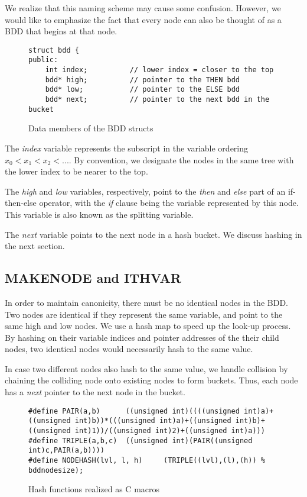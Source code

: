 \documentclass[12pt]{article}
\begin{document}
We realize that this naming scheme may cause some confusion. However, we would like to emphasize the fact that every node can also be thought of as a BDD that begins at that node.

\begin{figure}[h!]
\begin{lstlisting}
struct bdd {
public:
    int index;          // lower index = closer to the top
    bdd* high;          // pointer to the THEN bdd
    bdd* low;           // pointer to the ELSE bdd
    bdd* next;          // pointer to the next bdd in the bucket
\end{lstlisting}
\caption{Data members of the BDD structs}
\end{figure}

	The \textit{index} variable represents the subscript in the variable ordering $x_0 < x_1 < x_2 < ... $. By convention, we designate the nodes in the same tree with the lower index to be nearer to the top.

The \textit{high} and \textit{low} variables, respectively, point to the \textit{then} and \textit{else} part of an if-then-else operator, with the \textit{if} clause being the variable represented by this node. This variable is also known as the splitting variable.

The \textit{next} variable points to the next node in a hash bucket. We discuss hashing in the next section.

\subsection{MAKENODE and ITHVAR}
In order to maintain canonicity, there must be no identical nodes in the BDD. Two nodes are identical if they represent the same variable, and point to the same high and low nodes. We use a hash map to speed up the look-up process. By hashing on their variable indices and pointer addresses of the their child nodes, two identical nodes would necessarily hash to the same value.

In case two different nodes also hash to the same value, we handle collision by chaining the colliding node onto existing nodes to form buckets. Thus, each node has a \textit{next} pointer to the next node in the bucket.

\begin{figure}[h!]
\begin{lstlisting}
#define PAIR(a,b)      ((unsigned int)((((unsigned int)a)+((unsigned int)b))*(((unsigned int)a)+((unsigned int)b)+((unsigned int)1))/((unsigned int)2)+((unsigned int)a)))
#define TRIPLE(a,b,c)  ((unsigned int)(PAIR((unsigned int)c,PAIR(a,b))))
#define NODEHASH(lvl, l, h)     (TRIPLE((lvl),(l),(h)) % bddnodesize);
\end{lstlisting}
\caption{Hash functions realized as C macros}
\end{figure}
\end{document}

